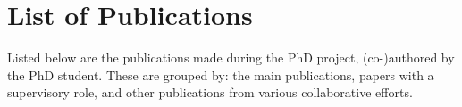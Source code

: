 \chapter*{List of Publications}\label{ch:listOfPublications}
Listed below are the publications made during the PhD project, (co-)authored by the PhD student. These are grouped by: the main publications, papers with a supervisory role, and other publications from various collaborative efforts.
{
\makeatletter
\renewenvironment{thebibliography}[1]
     {\subsubsection*{\bibname}%
      \@mkboth{\MakeUppercase\bibname}{\MakeUppercase\bibname}%
      \list{\@biblabel{\@Alph\c@enumiv}}%
           {\settowidth\labelwidth{\@biblabel{\@Alph#1}}%
            \leftmargin\labelwidth
            \advance\leftmargin\labelsep
            \@openbib@code
            \usecounter{enumiv}%
            \let\p@enumiv\@empty
            \renewcommand\theenumiv{\@Alph\c@enumiv}}%
      \sloppy
      \clubpenalty4000
      \@clubpenalty \clubpenalty
      \widowpenalty4000%
      \sfcode`\.\@m}
     {\def\@noitemerr
       {\@latex@warning{Empty `thebibliography' environment}}%
      \endlist}
\makeatother


\makeatletter
\renewenvironment{thebibliography}[1]
     {\subsubsection*{\bibname}%
      \@mkboth{\MakeUppercase\bibname}{\MakeUppercase\bibname}%
      \list{\@biblabel{S\@arabic\c@enumiv}}%
           {\settowidth\labelwidth{\@biblabel{S#1}}%
            \leftmargin\labelwidth
            \advance\leftmargin\labelsep
            \@openbib@code
            \usecounter{enumiv}%
            \let\p@enumiv\@empty
            \renewcommand\theenumiv{S\@arabic\c@enumiv}}%
      \sloppy
      \clubpenalty4000
      \@clubpenalty \clubpenalty
      \widowpenalty4000%
      \sfcode`\.\@m}
     {\def\@noitemerr
       {\@latex@warning{Empty `thebibliography' environment}}%
      \endlist}
\makeatother


}
